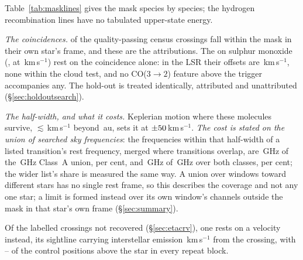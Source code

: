 Table~\ref{tab:masklines} gives the mask species by species; the hydrogen
recombination lines have no tabulated upper-state energy.

\begin{table}
\centering
\footnotesize
\caption{The line mask, by species: the number $N$ of transitions, the
frequency range they span inside the searched intervals and their
upper-state energies.}
\label{tab:masklines}

\end{table}

\emph{The coincidences.} \MkNCoinc{} of the
\CsNCrossQp{} quality-passing census crossings fall within the mask in their own star's frame, and these
are the \MkAttr{} attributions. The \SoNCrossWord{} on sulphur monoxide
(\SoStars, at \SoDvList\,km\,s$^{-1}$) rest on the coincidence alone: in the
LSR their offsets are \SoDvLsrList\,km\,s$^{-1}$, none within the cloud test,
and no CO($3\to2$) feature above the trigger accompanies any.
The hold-out is treated identically, \HoNAttr{} attributed and \HoNUnattr{}
unattributed (\S\ref{sec:holdoutsearch}).

\emph{The half-width, and what it costs.} Keplerian motion where these
molecules survive, $\lesssim$\EcKepVKms\,km\,s$^{-1}$ beyond \EcKepRAu\,au, sets it at
$\pm50$\,km\,s$^{-1}$. \emph{The cost is stated on the union of
searched sky frequencies}: the frequencies within that half-width of a
listed transition's rest frequency, merged where transitions overlap, are \MkMaskAGHz\,GHz of the
\CvUnionA\,GHz Class~A union, \MkMaskAPct{} per cent, and \FrMaskLostGHz\,GHz
of \FrMaskUnionGHz\,GHz over both classes, \FrMaskPct{} per cent; the wider
list's share is measured the same way. A union over windows toward different
stars has no single rest frame, so this describes the coverage and not any one
star; a limit is formed instead over its own window's channels outside the
mask in that star's own frame (\S\ref{sec:summary}).

Of the \MkAttrExcl{} labelled crossings not recovered (\S\ref{sec:etacrv}),
one rests on a velocity instead, its sightline carrying interstellar emission
\LsLupDv\,km\,s$^{-1}$ from the crossing, with \RqAjNgeLo--\RqAjNgeHi{} of
the \NCtrl{} control positions above the star in every repeat block.

